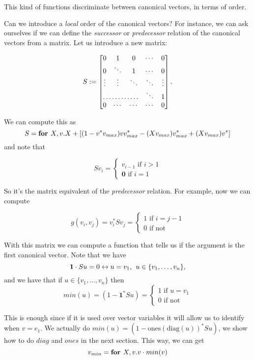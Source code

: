 This kind of functions discriminate between canonical vectors, in terms of order.

Can we introduce a \textit{local} order of the canonical vectors? For instance, we can ask ourselves if we can define the \textit{successor} or \textit{predecessor} relation of the canonical vectors from a matrix. Let us introduce a new matrix:

\[
S := \begin{bmatrix}
    0 & 1         & 0         & \cdots &  0 \\
    0 & \ddots & 1         & \cdots & 0 \\
    \vdots & \vdots & \ddots & \ddots & \vdots \\
    \hdotsfor{3} & \ddots & 1 \\
    0 & \cdots & \cdots & \cdots & 0 
\end{bmatrix}.
\]

We can compute this as $$S = \textbf{for } X,v. X+\left[ (1 - v^*v_{max})vv_{max}^* - (Xv_{max}) v_{max}^* + (Xv_{max})v^*\right]$$ and note that

\[
  			Sv_i=\begin{cases}
               v_{i-1} \text{ if } i > 1 \\
              \mathbf{0} \text{ if } i = 1
            \end{cases}
		\]

So it's the matrix equivalent of the \textit{predecessor} relation. For example, now we can compute 

\[
  			g(v_i, v_j)=v_i^*Sv_j=\begin{cases}
               1 \text{ if } i = j - 1 \\
               0 \text{ if not}
            \end{cases}
		\]
		
With this matrix we can compute a function that tells us if the argument is the first canonical vector. Note that we have $$\mathbf{1}\cdot Su=0\leftrightarrow u=v_1, \hspace{1ex} u\in\lbrace v_1,\ldots, v_n\rbrace,$$ and we have that if $u\in\lbrace v_1,\ldots, v_n\rbrace$ then
\[
  			min(u)=(1-\mathbf{1}^*Su)=\begin{cases}
               1 \text{ if } u = v_1 \\
               0 \text{ if not}
            \end{cases}
		\]
		
This is enough since if it is used over vector variables it will allow us to identify when $v=e_1$. We actually do $min(u)=(1-\text{ones}(\text{diag}(u))^*Su)$, we show how to do $diag$ and $ones$ in the next section. This way, we can get $$v_{min} = \textbf{for } X,v. v\cdot min(v)$$ 

